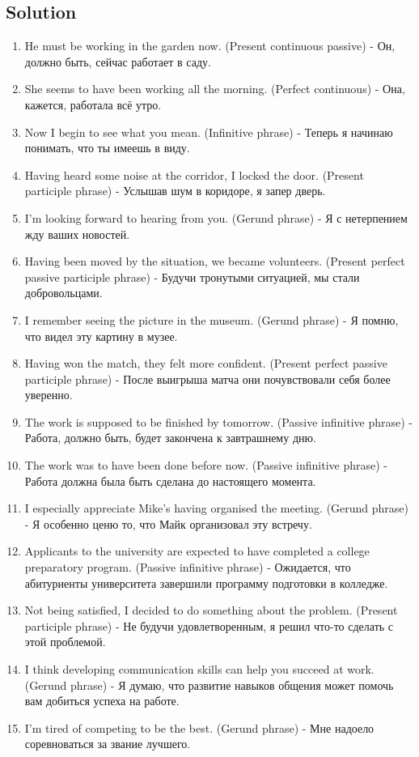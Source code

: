 \subsection*{Solution}
\begin{enumerate}
      \item He must be working in the garden now. (Present continuous passive) - Он, должно быть, сейчас работает в саду.
      \item She seems to have been working all the morning. (Perfect continuous) - Она, кажется, работала всё утро.
      \item Now I begin to see what you mean. (Infinitive phrase) - Теперь я начинаю понимать, что ты имеешь в виду.
      \item Having heard some noise at the corridor, I locked the door. (Present participle phrase) - Услышав шум в коридоре, я запер дверь.
      \item I’m looking forward to hearing from you. (Gerund phrase) - Я с нетерпением жду ваших новостей.
      \item Having been moved by the situation, we became volunteers. (Present perfect passive participle phrase) - Будучи тронутыми ситуацией, мы стали добровольцами.
      \item I remember seeing the picture in the museum. (Gerund phrase) - Я помню, что видел эту картину в музее.
      \item Having won the match, they felt more confident. (Present perfect passive participle phrase) - После выигрыша матча они почувствовали себя более уверенно.
      \item The work is supposed to be finished by tomorrow. (Passive infinitive phrase) - Работа, должно быть, будет закончена к завтрашнему дню.
      \item The work was to have been done before now. (Passive infinitive phrase) - Работа должна была быть сделана до настоящего момента.
      \item I especially appreciate Mike's having organised the meeting. (Gerund phrase) - Я особенно ценю то, что Майк организовал эту встречу.
      \item Applicants to the university are expected to have completed a college preparatory program. (Passive infinitive phrase) - Ожидается, что абитуриенты университета завершили программу подготовки в колледже.
      \item Not being satisfied, I decided to do something about the problem. (Present participle phrase) - Не будучи удовлетворенным, я решил что-то сделать с этой проблемой.
      \item I think developing communication skills can help you succeed at work. (Gerund phrase) - Я думаю, что развитие навыков общения может помочь вам добиться успеха на работе.
      \item I’m tired of competing to be the best. (Gerund phrase) - Мне надоело соревноваться за звание лучшего.
\end{enumerate}